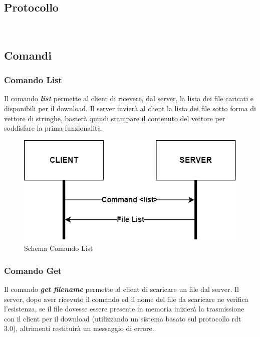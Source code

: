 \documentclass{article}
\begin{document}
\ \\

\subsection{Protocollo}


\ \\

\subsection{Comandi}
\subsubsection{Comando List}


Il comando \textbf{\emph{list}} permette al client di ricevere, dal server, la lista dei file caricati e disponibili per il download.
Il server invierà al client la lista dei file sotto forma di vettore di stringhe, basterà quindi stampare il contenuto del vettore per soddisfare la prima funzionalità.

\begin{figure}[!htb]
  \includegraphics[width=\linewidth]{commandList.png}
  \caption{Schema Comando List}
\end{figure}

\subsubsection{Comando Get}


Il comando \textbf{\emph{get filename}} permette al client di scaricare un file dal server. Il server, dopo aver ricevuto il comando ed il nome del file da scaricare
ne verifica l'esistenza, se il file dovesse essere presente in memoria inizierà la trasmissione con il client per il download (utilizzando un sistema basato sul protocollo rdt 3.0), altrimenti restituirà un messaggio di errore. 
\end{document}
